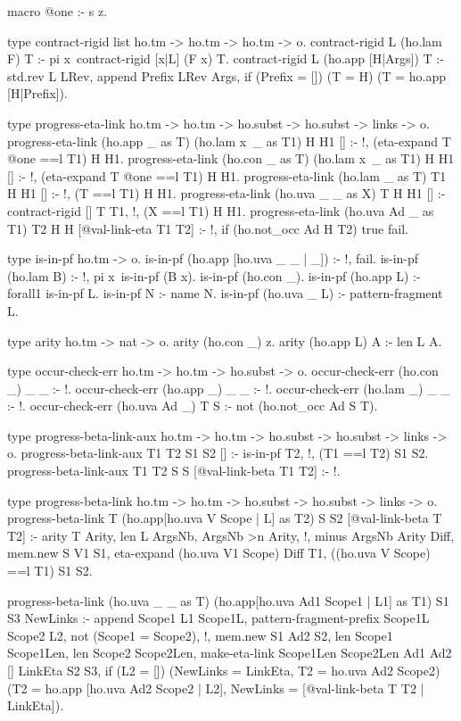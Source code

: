 \begin{elpicode}
  
  macro @one :- s z.

  type contract-rigid list ho.tm -> ho.tm -> ho.tm -> o.
  contract-rigid L (ho.lam F) T :- 
    pi x\ contract-rigid [x|L] (F x) T. %
  contract-rigid L (ho.app [H|Args]) T :- 
    std.rev L LRev, append Prefix LRev Args,
    if (Prefix = []) (T = H) (T = ho.app [H|Prefix]).

  type progress-eta-link ho.tm -> ho.tm -> ho.subst -> ho.subst -> links -> o.
  progress-eta-link (ho.app _ as T) (ho.lam x\ _ as T1) H H1 [] :- !, 
    ({eta-expand T @one} ==l T1) H H1.
  progress-eta-link (ho.con _ as T) (ho.lam x\ _ as T1) H H1 [] :- !, 
    ({eta-expand T @one} ==l T1) H H1.
  progress-eta-link (ho.lam _ as T) T1 H H1 [] :- !, 
    (T ==l T1) H H1.
  progress-eta-link (ho.uva _ _ as X) T H H1 [] :- 
    contract-rigid [] T T1, !, (X ==l T1) H H1.
  progress-eta-link (ho.uva Ad _ as T1) T2 H H [@val-link-eta T1 T2] :- !, 
    if (ho.not_occ Ad H T2) true fail.

  type is-in-pf ho.tm -> o.
  is-in-pf (ho.app [ho.uva _ _ | _]) :- !, fail.
  is-in-pf (ho.lam B) :- !, pi x\ is-in-pf (B x).
  is-in-pf (ho.con _).
  is-in-pf (ho.app L) :- forall1 is-in-pf L.
  is-in-pf N :- name N.
  is-in-pf (ho.uva _ L) :- pattern-fragment L.

  type arity ho.tm -> nat -> o.
  arity (ho.con _) z.
  arity (ho.app L) A :- len L A.

  type occur-check-err ho.tm -> ho.tm -> ho.subst -> o.
  occur-check-err (ho.con _) _ _ :- !.
  occur-check-err (ho.app _) _ _ :- !.
  occur-check-err (ho.lam _) _ _ :- !.
  occur-check-err (ho.uva Ad _) T S :-
    not (ho.not_occ Ad S T).

  type progress-beta-link-aux ho.tm -> ho.tm -> 
          ho.subst -> ho.subst -> links -> o.
  progress-beta-link-aux T1 T2 S1 S2 [] :-  is-in-pf T2, !,
    (T1 ==l T2) S1 S2.
  progress-beta-link-aux T1 T2 S S [@val-link-beta T1 T2] :- !.

  type progress-beta-link ho.tm -> ho.tm -> ho.subst -> 
        ho.subst -> links -> o.
  progress-beta-link T (ho.app[ho.uva V Scope | L] as T2) S S2 [@val-link-beta T T2] :- 
    arity T Arity, len L ArgsNb, ArgsNb >n Arity, !,
    minus ArgsNb Arity Diff, mem.new S V1 S1,
    eta-expand (ho.uva V1 Scope) Diff T1,
    ((ho.uva V Scope) ==l T1) S1 S2.

  progress-beta-link (ho.uva _ _ as T) (ho.app[ho.uva Ad1 Scope1 | L1] as T1) S1 S3 NewLinks :-
    append Scope1 L1 Scope1L,
    pattern-fragment-prefix Scope1L Scope2 L2,
    not (Scope1 = Scope2), !,
    mem.new S1 Ad2 S2,
    len Scope1 Scope1Len,
    len Scope2 Scope2Len,
    make-eta-link Scope1Len Scope2Len Ad1 Ad2 [] LinkEta S2 S3,
    if (L2 = []) (NewLinks = LinkEta, T2 = ho.uva Ad2 Scope2) 
      (T2 = ho.app [ho.uva Ad2 Scope2 | L2], 
      NewLinks = [@val-link-beta T T2 | LinkEta]).


\end{elpicode}
